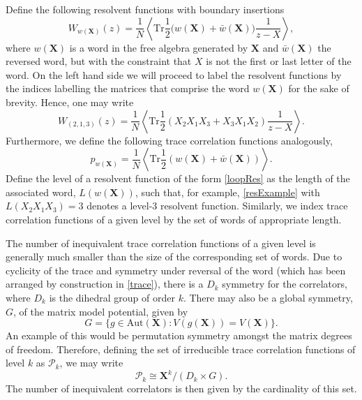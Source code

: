 Define the following resolvent functions with boundary insertions
%
\begin{equation}
    \label{loopRes}
    W_{w(\mathbf{X})}(z) = \frac{1}{N} \left\langle \text{Tr} \frac{1}{2} \big( w(\mathbf{X}) + \bar{w}(\mathbf{X})\big) \frac{1}{z-X} \right\rangle,
\end{equation}
%
where $w(\mathbf{X})$ is a word in the free algebra generated by $\mathbf{X}$ and
$\bar{w}(\mathbf{X})$ the reversed word, but with the constraint that $X$ is not the first or last
letter of the word. On the left hand side we will proceed to label the resolvent functions by the
indices labelling the matrices that comprise the word $w(\mathbf{X})$ for the sake of brevity.
Hence, one may write
%
\begin{equation}
    \label{resExample}
    W_{(2,1,3)}(z) = \frac{1}{N} \left\langle \text{Tr} \frac{1}{2} (X_2 X_1 X_3 + X_3 X_1 X_2 ) \frac{1}{z-X} \right\rangle.
\end{equation}
%
Furthermore, we define the following trace correlation functions analogously,
%
\begin{equation}
    \label{trace}
    p_{w(\mathbf{X})}= \frac{1}{N} \left\langle \text{Tr} \frac{1}{2} (w(\mathbf{X}) + \bar{w}(\mathbf{X}))\right\rangle.
\end{equation}
%
Define the level of a resolvent function of the form \eqref{loopRes} as the length of the
associated word, $L(w(\mathbf{X}))$, such that, for example, \eqref{resExample} with $L(X_2 X_1
    X_3)=3$ denotes a level-3 resolvent function. Similarly, we index trace correlation functions of a
given level by the set of words of appropriate length.

The number of inequivalent trace correlation functions of a given level is generally much smaller
than the size of the corresponding set of words. Due to cyclicity of the trace and symmetry under
reversal of the word (which has been arranged by construction in \eqref{trace}), there is a $D_k$
symmetry for the correlators, where $D_k$ is the dihedral group of order $k$. There may also be a
global symmetry, $G$, of the matrix model potential, given by
%
\begin{equation}
    \label{symmetry}
    G = \{ g\in \text{Aut}(\mathbf{X}) : V(g(\mathbf{X}))=V(\mathbf{X})\}.
\end{equation}
%
An example of this would be permutation symmetry amongst the matrix degrees of freedom. Therefore,
defining the set of irreducible trace correlation functions of level $k$ as $\mathcal{P}_k$, we may
write
%
\begin{equation}
    \label{irreducibleTrace}
    \mathcal{P}_k \cong \mathbf{X}^k / (D_k \times G).
\end{equation}
%
The number of inequivalent correlators is then given by the cardinality of this set.

